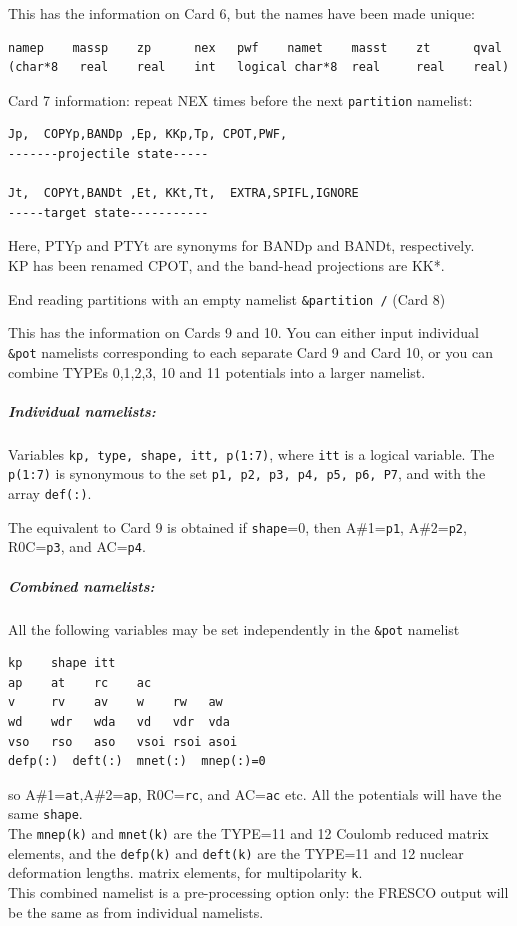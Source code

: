 \documentclass[11pt]{article}
\begin{document}
This has the information on Card 6, but the names have been made unique:
\begin{verbatim}
namep    massp    zp      nex   pwf    namet    masst    zt      qval
(char*8   real    real    int   logical char*8  real     real    real)
\end{verbatim}

Card 7 information: repeat NEX times before the next {\tt partition} namelist:
\begin{verbatim}
Jp,  COPYp,BANDp ,Ep, KKp,Tp, CPOT,PWF,
-------projectile state-----

Jt,  COPYt,BANDt ,Et, KKt,Tt,  EXTRA,SPIFL,IGNORE
-----target state-----------
\end{verbatim}
Here, PTYp and PTYt are synonyms for BANDp and BANDt, respectively.\\
KP has been renamed CPOT, and the band-head projections are KK*.

\bigskip
End reading partitions with an empty namelist {\tt \&partition /} (Card 8)


This has the information on Cards 9 and 10.
You can either input individual {\tt \&pot} namelists corresponding to each
separate Card 9 and Card 10, or you can combine TYPEs 0,1,2,3, 10 and 11 potentials
into a larger namelist.

\subparagraph*{Individual namelists:}

Variables {\tt kp, type, shape, itt, p(1:7)}, where {\tt itt} is a logical variable.
The {\tt p(1:7)} is synonymous to the set {\tt p1, p2, p3, p4, p5, p6, P7},
and with the array {\tt def(:)}.

The equivalent to Card 9 is obtained if {\tt shape}=0,
then  A\#1={\tt p1}, A\#2={\tt p2},  R0C={\tt p3}, and AC={\tt p4}.


\subparagraph*{Combined namelists:}
All the following variables may be set independently in the {\tt \&pot} namelist
\begin{verbatim}
kp    shape itt
ap    at    rc    ac
v     rv    av    w    rw   aw
wd    wdr   wda   vd   vdr  vda
vso   rso   aso   vsoi rsoi asoi
defp(:)  deft(:)  mnet(:)  mnep(:)=0
\end{verbatim}
so  A\#1={\tt at},A\#2={\tt ap},  R0C={\tt rc}, and AC={\tt ac} etc.
All the potentials will have the same {\tt shape}.\\
The {\tt mnep(k)} and {\tt mnet(k)} are the TYPE=11 and 12 Coulomb reduced matrix elements,
and
the {\tt defp(k)} and {\tt deft(k)} are the TYPE=11 and 12 nuclear deformation lengths.
matrix elements, for multipolarity {\tt k}.\\
This combined namelist is a pre-processing option only: the FRESCO output
will be the same as from individual namelists.
\end{document}
